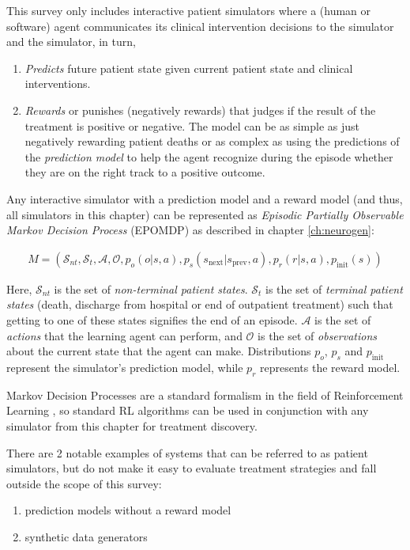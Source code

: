 This survey only includes interactive patient simulators where a (human or software) agent communicates its clinical intervention decisions to the simulator and the simulator, in turn,
\begin{enumerate}
    \item \emph{Predicts} future patient state given current patient state and clinical interventions.
    \item \emph{Rewards} or punishes (negatively rewards) that judges if the result of the treatment is positive or negative. The model can be as simple as just negatively rewarding patient deaths or as complex as using the predictions of the \emph{prediction model} to help the agent recognize during the episode whether they are on the right track to a positive outcome.
\end{enumerate}

Any interactive simulator with a prediction model and a reward model (and thus, all simulators in this chapter) can be represented as {\em Episodic Partially Observable Markov Decision Process} (EPOMDP) as described in chapter \ref{ch:neurogen}:

\begin{multline}
M = (\mathcal{S}_{nt}, \mathcal{S}_t, \mathcal{A}, \mathcal{O}, p_o(o | s, a), p_s(s_\text{next} | s_\text{prev}, a), p_r(r | s, a), p_\text{init}(s))
\end{multline}

Here, $\mathcal{S}_{nt}$ is the set of {\em non-terminal patient states}. $\mathcal{S}_{t}$ is the set of {\em terminal patient states} (death, discharge from hospital or end of outpatient treatment) such that getting to one of these states signifies the end of an episode. 
$\mathcal{A}$ is the set of {\em actions} that the learning agent can perform, and $\mathcal{O}$ is the set of {\em observations} about the current state that the agent can make. 
Distributions $p_o$, $p_s$ and $p_\text{init}$ represent the simulator's prediction model, while $p_r$ represents the reward model.

Markov Decision Processes are a standard formalism in the field of Reinforcement Learning \cite{suttonReinforcementLearningSecond2018}, so standard RL algorithms can be used in conjunction with any simulator from this chapter for treatment discovery.

There are 2 notable examples of systems that can be referred to as patient simulators, but do not make it easy to evaluate treatment strategies and fall outside the scope of this survey: 
\begin{enumerate}
    \item prediction models without a reward model
    \item synthetic data generators \cite{datagens}
\end{enumerate}

